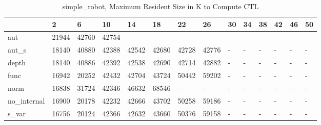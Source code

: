 \begin{table}
\caption{simple_robot, Maximum Resident Size in K to Compute CTL}
\label{simple_robot_CTL_size}
\begin{tabular}{llllllllllllll}
\toprule
 & 2 & 6 & 10 & 14 & 18 & 22 & 26 & 30 & 34 & 38 & 42 & 46 & 50 \\
\midrule
aut & 21944 & 42760 & 42754 & - & - & - & - & - & - & - & - & - & - \\
aut_s & 18140 & 40880 & 42388 & 42542 & 42680 & 42728 & 42776 & - & - & - & - & - & - \\
depth & 18140 & 40886 & 42392 & 42538 & 42690 & 42714 & 42882 & - & - & - & - & - & - \\
func & 16942 & 20252 & 42432 & 42704 & 43724 & 50442 & 59202 & - & - & - & - & - & - \\
norm & 16838 & 31724 & 42346 & 46632 & 68546 & - & - & - & - & - & - & - & - \\
no_internal & 16900 & 20178 & 42232 & 42666 & 43702 & 50258 & 59186 & - & - & - & - & - & - \\
s_var & 16756 & 20124 & 42366 & 42632 & 43660 & 50376 & 59158 & - & - & - & - & - & - \\
\bottomrule
\end{tabular}
\end{table}
